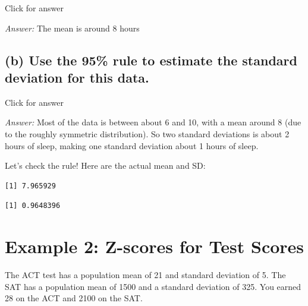 \documentclass[
]{book}
\newenvironment{Shaded}{\begin{snugshade}}{\end{snugshade}}
\newcommand{\FunctionTok}[1]{\textcolor[rgb]{0.00,0.00,0.00}{#1}}
\newcommand{\NormalTok}[1]{#1}
\newcommand{\SpecialCharTok}[1]{\textcolor[rgb]{0.00,0.00,0.00}{#1}}
\begin{document}
Click for answer

\emph{Answer:} The mean is around 8 hours

\hypertarget{b-use-the-95-rule-to-estimate-the-standard-deviation-for-this-data.}{%
\subsection{(b) Use the 95\% rule to estimate the standard deviation for this data.}\label{b-use-the-95-rule-to-estimate-the-standard-deviation-for-this-data.}}

Click for answer

\emph{Answer:} Most of the data is between about 6 and 10, with a mean around 8 (due to the roughly symmetric
distribution). So two standard deviations is about 2 hours of sleep, making one standard deviation about
1 hours of sleep.

Let's check the rule! Here are the actual mean and SD:

\begin{Shaded}
\end{Shaded}

\begin{verbatim}
[1] 7.965929
\end{verbatim}

\begin{Shaded}
\end{Shaded}

\begin{verbatim}
[1] 0.9648396
\end{verbatim}

\hypertarget{example-2-z-scores-for-test-scores}{%
\section{Example 2: Z-scores for Test Scores}\label{example-2-z-scores-for-test-scores}}

The ACT test has a population mean of 21 and standard deviation of 5. The SAT has a population mean of 1500 and a standard deviation of 325. You earned 28 on the ACT and 2100 on the SAT.
\end{document}
